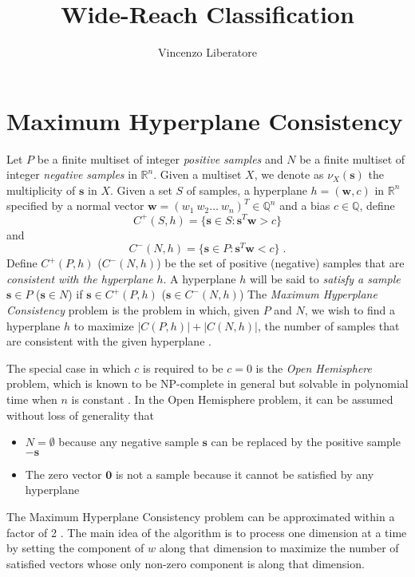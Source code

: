 \documentclass[11pt]{article}
\title{Wide-Reach Classification}
\author{Vincenzo Liberatore}
\theoremstyle{definition}
\newcommand{\R}{\mathbb{R}}
\newcommand{\Q}{\mathbb{Q}}
\newcommand{\vect}[1]{\mathbf{#1}}
\begin{document}
\maketitle

\section{Maximum Hyperplane Consistency}
Let $P$ be a finite multiset of integer {\em positive samples\/} and 
$N$ be a finite multiset of integer {\em negative samples\/} in $\R^n$.
Given a multiset $X$, we denote as $\nu_X(\vect{s})$ the multiplicity of $\vect{s}$ in $X$. 
Given a set $S$ of samples, a hyperplane $h = (\vect{w}, c)$ in $\R^n$ 
specified by a normal vector $\vect{w} = (w_1 ~ w_2 \dots ~ w_n)^T \in \Q^n$ and a bias $c \in \Q$,
define 
$$C^+(S, h) = \{ \vect{s} \in S : \vect{s}^T \vect{w} > c \}$$
and 
$$C^-(N, h) = \{ \vect{s} \in P : \vect{s}^T \vect{w} < c \}\;.$$
Define $C^+(P, h)$ ($C^-(N, h)$) be the set of positive 
(negative) samples that are 
{\em consistent with the hyperplane\/} $h$.
A hyperplane $h$ will be said to {\em satisfy a sample\/} 
$\vect{s} \in P$ ($\vect{s} \in N$)
if $\vect{s} \in C^+(P, h)$ ($\vect{s} \in C^-(N, h)$)
The {\em Maximum Hyperplane Consistency\/} problem is the problem in which,
given $P$ and $N$, we wish to find a hyperplane $h$
to maximize $|C(P, h)| + |C(N, h)|$, the number of samples 
that are consistent with the given hyperplane \cite{countingapprox}.

The special case in which $c$ is required to be $c = 0$ is the {\em Open Hemisphere\/} problem,
which is known to be NP-complete in general but solvable in polynomial time
when $n$ is constant \cite{densehemisphere}.
In the Open Hemisphere problem, it can be assumed without loss of generality that 
\begin{itemize} 
\item $N = \emptyset$ because 
any negative sample $\vect{s}$ can be replaced by the positive sample $-\vect{s}$
\item The zero vector $\vect{0}$ is not a sample because it cannot be satisfied by any hyperplane
\end{itemize}

The Maximum Hyperplane Consistency problem can be approximated within a factor of 2 \cite{countingapprox}.
The main idea of the algorithm is to process one dimension at a time 
by setting the component of $w$ along that dimension to maximize the number of satisfied vectors
whose only non-zero component is along that dimension.
\end{document}
